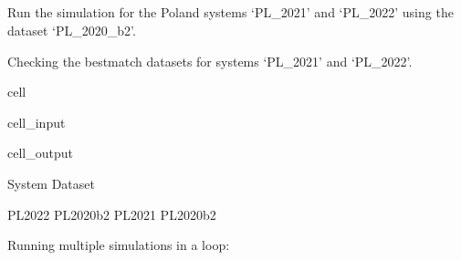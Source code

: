 \documentclass[letterpaper,10pt,english]{sphinxmanual}
\begin{document}
\subsection{}
\label{\detokenize{example:run-two-systems-with-default-parameters}}
\sphinxAtStartPar
Run the simulation for the Poland systems ‘PL\_2021’ and ‘PL\_2022’ using the dataset ‘PL\_2020\_b2’.

\sphinxAtStartPar
Checking the best\sphinxhyphen{}match datasets for systems ‘PL\_2021’ and ‘PL\_2022’.

\begin{sphinxuseclass}{cell}
\begin{sphinxuseclass}{cell_input}
\begin{sphinxVerbatim}[commandchars=\\\{\}]
    
      \PYG{p}{[}\PYG{p}{]}\PYG{p}{[}\PYG{p}{]}\PYG{p}{[}\PYG{p}{]}
      
\end{sphinxVerbatim}

\end{sphinxuseclass}
\begin{sphinxuseclass}{cell_output}
\begin{sphinxVerbatim}[commandchars=\\\{\}]
System    Dataset
\end{sphinxVerbatim}

\begin{sphinxVerbatim}[commandchars=\\\{\}]
PL\PYGZus{}2022   PL\PYGZus{}2020\PYGZus{}b2
PL\PYGZus{}2021   PL\PYGZus{}2020\PYGZus{}b2
\end{sphinxVerbatim}

\end{sphinxuseclass}
\end{sphinxuseclass}
\sphinxAtStartPar
Running multiple simulations in a loop:
\end{document}
